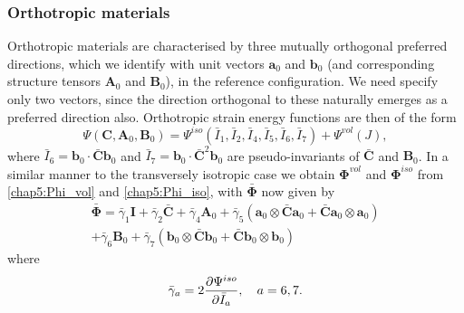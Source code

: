 	\subsubsection*{Orthotropic materials}
Orthotropic materials are characterised by three mutually orthogonal preferred directions, which we identify with unit vectors $\mathbf{a}_0$ and $\mathbf{b}_0$ (and corresponding structure tensors $\mathbf{A}_0$ and $\mathbf{B}_0$), in the reference configuration. We need specify only two vectors, since the direction orthogonal to these naturally emerges as a preferred direction also. Orthotropic strain energy functions are then of the form
\begin{equation}
\Psi (\mathbf{C}, \mathbf{A}_0, \mathbf{B}_0) = \Psi^{iso}(\bar{I}_1, \bar{I}_2, \bar{I}_4, \bar{I}_5, \bar{I}_6, \bar{I}_7) + \Psi^{vol}(J),
\end{equation}
where $ \bar{I}_6 = \mathbf{b}_0 \cdot \mathbf{\bar{C}} \mathbf{b}_0 $ and $ \bar{I}_7 =  \mathbf{b}_0 \cdot \mathbf{\bar{C}}^2 \mathbf{b}_0 $ are pseudo-invariants of $ \mathbf{\bar{C}} $ and $ \mathbf{B}_0 $. In a similar manner to the transversely isotropic case we obtain $ \boldsymbol \Phi^{vol} $ and $ \boldsymbol \Phi^{iso} $ from \eqref{chap5:Phi_vol} and \eqref{chap5:Phi_iso}, with $\bar{\boldsymbol \Phi} $ now given by
\begin{equation}
\label{chap5:PhiBarOrtho}
\begin{split}
\bar{\boldsymbol \Phi} = \bar{\gamma}_1 \mathbf{I} + \bar{\gamma}_2 \mathbf{\bar{C}} + \bar{\gamma}_4 \mathbf{A}_0 + \bar{\gamma}_5 ( \mathbf{a}_0 \otimes \mathbf{\bar{C}} \mathbf{a}_0 +  \mathbf{\bar{C}} \mathbf{a}_0 \otimes \mathbf{a}_0 ) \\
+ \bar{\gamma}_6 \mathbf{B}_0 + \bar{\gamma}_7 ( \mathbf{b}_0 \otimes \mathbf{\bar{C}} \mathbf{b}_0 +  \mathbf{\bar{C}} \mathbf{b}_0 \otimes \mathbf{b}_0 )
\end{split}
\end{equation}
where
\begin{equation}
\bar{\gamma}_a = 2 \dfrac{\partial \Psi^{iso}}{\partial \bar{I}_a}, \quad a = 6, 7.
\end{equation}
	
